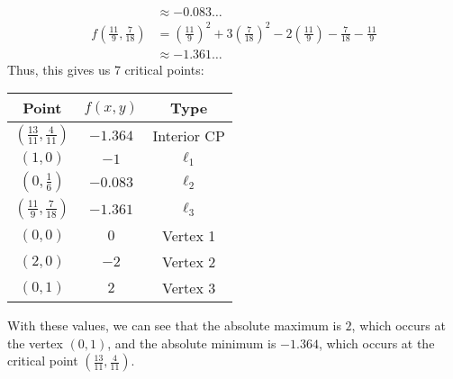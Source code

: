 \documentclass[11pt]{article}
\begin{document}
\begin{enumerate}
{\begin{align*}
            &\approx -0.083\ldots \\
            f\left(\tfrac{11}{9}, \tfrac{7}{18}\right)  & = \left(\tfrac{11}{9}\right)^{2} + 3\left(\tfrac{7}{18}\right)^{2} - 2\left(\tfrac{11}{9}\right) - \tfrac{7}{18} - \tfrac{11}{9} \\
            &\approx -1.361\ldots
          \end{align*}
          Thus, this gives us 7 critical points:
          \begin{multicols}{2}
            \begin{center}
            \begin{tabular}{ccc}
              \toprule
              \textbf{Point} & \(f(x,y)\) & \textbf{Type} \\ \midrule
              \(\left(\tfrac{13}{11}, \tfrac{4}{11}\right)\) & \(-1.364\) & Interior CP \\ \midrule
              \((1,0)\) & \(-1\) & \(\ell_{1}\) \\ \midrule
              \(\left(0, \tfrac{1}{6}\right)\) & \(-0.083\) & \(\ell_{2}\) \\ \midrule
              \(\left(\tfrac{11}{9}, \tfrac{7}{18}\right)\) & \(-1.361\) & \(\ell_{3}\) \\ \midrule
              \((0,0)\) & \(0\) & Vertex 1 \\ \midrule
              \((2,0)\) & \(-2\) & Vertex 2 \\ \midrule
              \((0,1)\) & \(2\) & Vertex 3 \\ \bottomrule
            \end{tabular}
            \end{center}

            \flushright
          \end{multicols}
          With these values, we can see that the absolute maximum is \(\boxed{2}\), which occurs at the vertex \((0,1)\), and the absolute minimum is \(\boxed{-1.364}\), which occurs at the critical point \(\left(\tfrac{13}{11}, \tfrac{4}{11}\right)\).

}
\end{enumerate}
\end{document}
